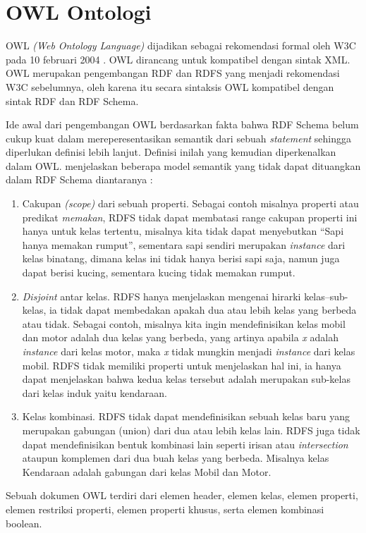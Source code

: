 \section{OWL Ontologi}
OWL \emph{(Web Ontology Language)} dijadikan sebagai rekomendasi formal oleh W3C pada 10 februari 2004 \citep{liyang_yu}. OWL dirancang untuk kompatibel dengan sintak XML. OWL merupakan pengembangan RDF dan RDFS yang menjadi rekomendasi W3C sebelumnya, oleh karena itu secara sintaksis OWL kompatibel dengan sintak RDF dan RDF Schema.

Ide awal dari pengembangan OWL berdasarkan fakta bahwa RDF Schema belum cukup kuat dalam mereperesentasikan semantik dari sebuah \emph{statement} sehingga diperlukan definisi lebih lanjut. Definisi inilah yang kemudian diperkenalkan dalam OWL. \citet*{antoniou} menjelaskan beberapa model semantik yang tidak dapat dituangkan dalam RDF Schema diantaranya :
\begin{enumerate}
	\item Cakupan \emph{(scope)} dari sebuah properti. Sebagai contoh misalnya properti atau predikat \textit{memakan}, RDFS tidak dapat membatasi range cakupan properti ini hanya untuk kelas tertentu, misalnya kita tidak dapat menyebutkan ``Sapi hanya memakan rumput'', sementara sapi sendiri merupakan \emph{instance} dari kelas binatang, dimana kelas ini tidak hanya berisi sapi saja, namun juga dapat berisi kucing, sementara kucing tidak memakan rumput.
	\item \emph{Disjoint} antar kelas. RDFS hanya menjelaskan mengenai hirarki kelas--sub-kelas, ia tidak dapat membedakan apakah dua atau lebih kelas yang berbeda atau tidak. Sebagai contoh, misalnya kita ingin mendefinisikan kelas mobil dan motor adalah dua kelas yang berbeda, yang artinya apabila \emph{x} adalah \emph{instance} dari kelas motor, maka \emph{x} tidak mungkin menjadi \emph{instance} dari kelas mobil. RDFS tidak memiliki properti untuk menjelaskan hal ini, ia hanya dapat menjelaskan bahwa kedua kelas tersebut adalah merupakan sub-kelas dari kelas induk yaitu kendaraan.
	\item Kelas kombinasi. RDFS tidak dapat mendefinisikan sebuah kelas baru yang merupakan gabungan (union) dari dua atau lebih kelas lain. RDFS juga tidak dapat mendefinisikan bentuk kombinasi lain seperti irisan atau \emph{intersection} ataupun komplemen dari dua buah kelas yang berbeda. Misalnya kelas Kendaraan adalah gabungan dari kelas Mobil dan Motor.
\end{enumerate}
Sebuah dokumen OWL terdiri dari elemen header, elemen kelas, elemen properti, elemen restriksi properti, elemen properti khusus, serta elemen kombinasi boolean. 


